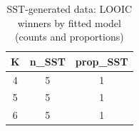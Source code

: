 \begin{table}[!h]
\centering
\caption{SST-generated data: LOOIC winners by fitted model (counts and proportions)\\\label{tab:sst-loo-winners}}
\centering
\begin{tabular}[t]{ccc}
\toprule
K & n_SST & prop_SST\\
\midrule
4 & 5 & 1\\
5 & 5 & 1\\
6 & 5 & 1\\
\bottomrule
\end{tabular}
\end{table}
